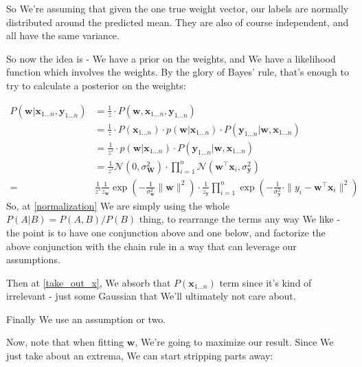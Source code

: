 \documentclass{article}
\begin{document}
		So We're assuming that given the one true weight vector, our labels are normally distributed around the predicted mean. They are also of course independent, and all have the same variance. 
		
		So now the idea is - We have a prior on the weights, and We have a likelihood function which involves the weights. By the glory of Bayes' rule, that's enough to try to calculate a posterior on the weights:
		
		\begin{align}
			P(\mathbf{w}|\mathbf{x}_{1\ldots n}, \mathbf{y}_{1\ldots n}) &= \frac{1}{z}\cdot P(\mathbf{w}, \mathbf{x}_{1\ldots n}, \mathbf{y}_{1\ldots n})\label{normalization}\\
			 &= \frac{1}{z}\cdot P(\mathbf{x}_{1\ldots n})\cdot p(\mathbf{w}|\mathbf{x}_{1\ldots n})\cdot P(\mathbf{y}_{1\ldots n}|\mathbf{w}, \mathbf{x}_{1\ldots n})\\
			&= \frac{1}{z'}\cdot p(\mathbf{w}|\mathbf{x}_{1\ldots n})\cdot P(\mathbf{y}_{1\ldots n}|\mathbf{w}, \mathbf{x}_{1\ldots n})\label{take_out_x}\\
			&= \frac{1}{z'} \mathcal{N}(0, \sigma^2_{\mathbf{W}}) \cdot \prod^n_{i=1} \mathcal{N}(\mathbf{w}^\top\mathbf{x}_i, \sigma^2_{\mathbf{y}})\\
			=& \frac{1}{z'} \frac{1}{z_{\mathbf{w}}}\exp\left(-\frac{1}{\sigma^2_{\mathbf{w}}}\|\mathbf{w}\|^2 \right) \cdot \frac{1}{z_{\mathbf{y}}}\prod^n_{i=1} \exp\left(-\frac{1}{\sigma^2_{\mathbf{y}}}\cdot\|y_i - \mathbf{w}^\top\mathbf{x}_i \|^2\right)
		\end{align}
			So, at \ref{normalization} We are simply using the whole $P(A|B) = P(A, B)/P(B)$ thing, to rearrange the terms any way We like - the point is to have one conjunction above and one below, and factorize the above conjunction with the chain rule in a way that can leverage our assumptions.
			
			Then at \ref{take_out_x}, We absorb that $P(\mathbf{x}_{1\ldots n})$ term since it's kind of irrelevant - just some Gaussian that We'll ultimately not care about. 
			
			Finally We use an assumption or two. 
			
			Now, note that when fitting $\mathbf{w}$, We're going to maximize our result. Since We just take about an extrema, We can start stripping parts away:
			
\end{document}
